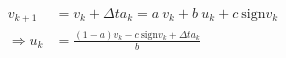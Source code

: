 \documentclass{article}
\begin{document}
\thispagestyle{empty}
\newcommand{\sign}{\text{sign}}


\begin{align}
v_{k+1}  & = v_k + \Delta t a_k = a~v_k + b~u_k + c~\sign{v_k} \nonumber \\
\Rightarrow u_k & = \frac{(1-a) v_k - c~\sign{v_k} + \Delta t a_k}{b} \nonumber
\end{align}
\end{document}
